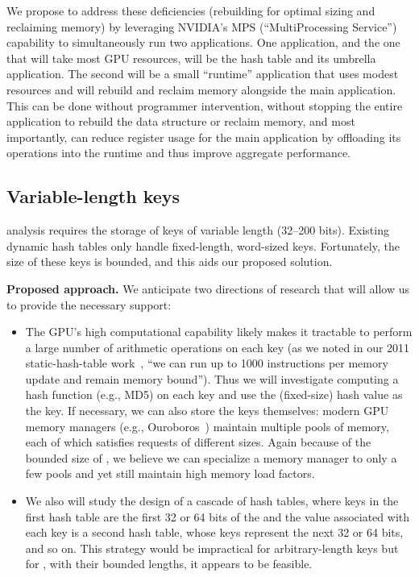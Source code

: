 We propose to address these deficiencies (rebuilding for optimal sizing and reclaiming memory) by leveraging NVIDIA's MPS (``MultiProcessing Service'') capability to simultaneously run two applications. One application, and the one that will take most GPU resources, will be the hash table and its umbrella application. The second will be a small ``runtime'' application that uses modest resources and will rebuild and reclaim memory alongside the main application. This can be done without programmer intervention, without stopping the entire application to rebuild the data structure or reclaim memory, and most importantly, can reduce register usage for the main application by offloading its operations into the runtime and thus improve aggregate performance.

\subsection{Variable-length keys}

\Kmer analysis requires the storage of \kmer keys of variable length (32--200 bits). Existing dynamic hash tables only handle fixed-length, word-sized keys. Fortunately, the size of these keys is bounded, and this aids our proposed solution.

\noindent
{\bf Proposed approach.}
We anticipate two directions of research that will allow us to provide the necessary support:

\begin{itemize}[noitemsep,nolistsep,leftmargin=*]
  \item The GPU's high computational capability likely makes it tractable to perform a large number of arithmetic operations on each key (as we noted in our 2011 static-hash-table work~\cite{Alcantara:2011:BAE}, ``we can run up to 1000 instructions per memory update and remain memory bound''). Thus we will investigate computing a hash function (e.g., MD5) on each key and use the (fixed-size) hash value as the key. If necessary, we can also store the keys themselves: modern GPU memory managers (e.g., Ouroboros~\cite{Winter:2020:OVQ}) maintain multiple pools of memory, each of which satisfies requests of different sizes. Again because of the bounded size of \kmers, we believe we can specialize a memory manager to only a few pools and yet still maintain high memory load factors.
  \item We also will study the design of a cascade of hash tables, where keys in the first hash table are the first 32 or 64 bits of the \kmer and the value associated with each key is a second hash table, whose keys represent the next 32 or 64 bits, and so on. This strategy would be impractical for arbitrary-length keys but for \kmers, with their bounded lengths, it appears to be feasible.
\end{itemize}

